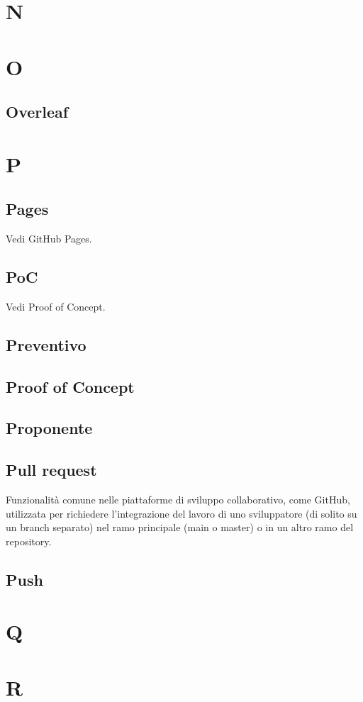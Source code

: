 \section{N}
\section{O}
    \subsection{Overleaf}
\section{P}
    \subsection{Pages}
    Vedi GitHub Pages.
    \subsection{PoC}
    Vedi Proof of Concept.
    \subsection{Preventivo}
    \subsection{Proof of Concept}
    \subsection{Proponente}
    \subsection{Pull request}
    Funzionalità comune nelle piattaforme di sviluppo collaborativo, come GitHub, utilizzata per 
    richiedere l'integrazione del lavoro di uno sviluppatore (di solito su un branch separato) 
    nel ramo principale (main o master) o in un altro ramo del repository.
    \subsection{Push}

\section{Q}
\section{R}

